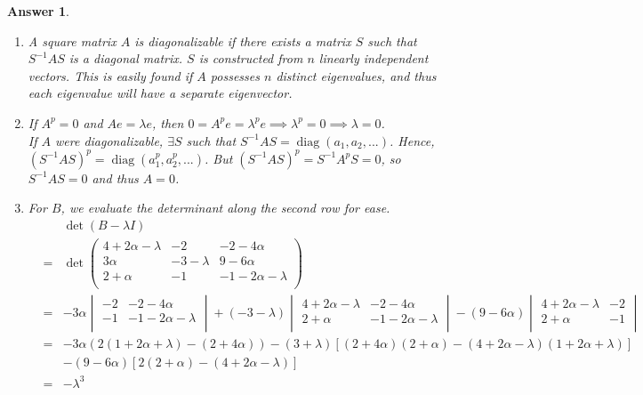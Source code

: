 \documentclass[a4paper]{article}
\DeclareMathOperator{\diag}{diag}
\newtheorem{ans}{Answer}[section]
\theoremstyle{new}
\begin{document}
\begin{ans}\leavevmode
\begin{enumerate}[label=(\alph*)]
\item A square matrix $A$ is diagonalizable if there exists a matrix $S$ such that $S^{-1}AS$ is a diagonal matrix. $S$ is constructed from $n$ linearly independent vectors. This is easily found if $A$ possesses $n$ distinct eigenvalues, and thus each eigenvalue will have a separate eigenvector.
\item If $A^p=0$ and $Ae=\lambda e$, then $0=A^pe=\lambda^pe\implies\lambda^p=0\implies\lambda=0$.\\[5pt]
If $A$ were diagonalizable, $\exists S$ such that $S^{-1}AS=\diag(a_1,a_2,...)$. Hence, $(S^{-1}AS)^p=\diag(a_1^p,a_2^p,...)$. But $(S^{-1}AS)^p=S^{-1}A^pS=0$, so $S^{-1}AS=0$ and thus $A=0$.
\item For $B$, we evaluate the determinant along the second row for ease.
\begin{eqnarray}
&&\det(B-\lambda I)\nonumber\\&=&\det\begin{pmatrix}4+2\alpha-\lambda&-2&-2-4\alpha\\3\alpha&-3-\lambda&9-6\alpha\\2+\alpha&-1&-1-2\alpha-\lambda\\\end{pmatrix}\nonumber\\&=&-3\alpha\begin{vmatrix}-2&-2-4\alpha\\-1&-1-2\alpha-\lambda\\\end{vmatrix}+(-3-\lambda)\begin{vmatrix}4+2\alpha-\lambda&-2-4\alpha\\2+\alpha&-1-2\alpha-\lambda\\\end{vmatrix}-(9-6\alpha)\begin{vmatrix}4+2\alpha-\lambda&-2\\2+\alpha&-1\\\end{vmatrix}\nonumber\nonumber\\&=&-3\alpha(2(1+2\alpha+\lambda)-(2+4\alpha))-(3+\lambda)[(2+4\alpha)(2+\alpha)-(4+2\alpha-\lambda)(1+2\alpha+\lambda)]\nonumber\\&&-(9-6\alpha)[2(2+\alpha)-(4+2\alpha-\lambda)]\nonumber\\&=&-\lambda^3\nonumber
\end{eqnarray}

\end{enumerate}
\end{ans}
\end{document}
